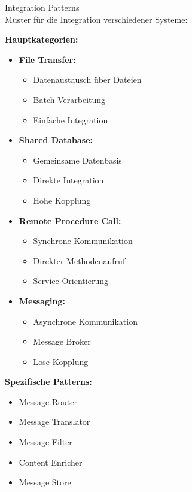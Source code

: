 \begin{concept}{Integration Patterns}\\
Muster für die Integration verschiedener Systeme:

\textbf{Hauptkategorien:}
\begin{itemize}
    \item \textbf{File Transfer:}
    \begin{itemize}
        \item Datenaustausch über Dateien
        \item Batch-Verarbeitung
        \item Einfache Integration
    \end{itemize}
    
    \item \textbf{Shared Database:}
    \begin{itemize}
        \item Gemeinsame Datenbasis
        \item Direkte Integration
        \item Hohe Kopplung
    \end{itemize}
    
    \item \textbf{Remote Procedure Call:}
    \begin{itemize}
        \item Synchrone Kommunikation
        \item Direkter Methodenaufruf
        \item Service-Orientierung
    \end{itemize}
    
    \item \textbf{Messaging:}
    \begin{itemize}
        \item Asynchrone Kommunikation
        \item Message Broker
        \item Lose Kopplung
    \end{itemize}
\end{itemize}

\textbf{Spezifische Patterns:}
\begin{itemize}
    \item Message Router
    \item Message Translator
    \item Message Filter
    \item Content Enricher
    \item Message Store
\end{itemize}
\end{concept}




